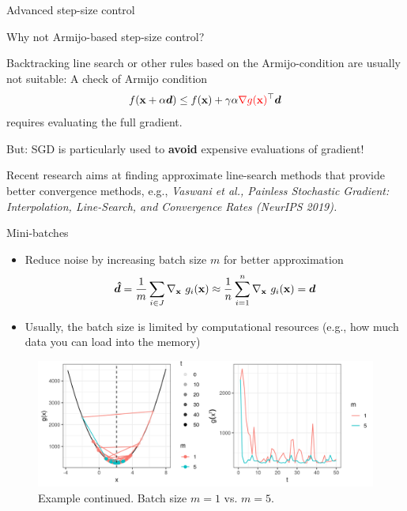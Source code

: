 \documentclass[11pt,compress,t,notes=noshow, xcolor=table]{beamer}
\begin{document}
\begin{vbframe}{Advanced step-size control} 

	\begin{blocki}{Why not Armijo-based step-size control? }
		\item Backtracking line search or other rules based on the Armijo-condition are usually not suitable: A check of Armijo condition 
		$$
		f(\mathbf{x} + \alpha \bm{d}) \le f(\mathbf{x}) + \gamma \alpha \textcolor{red}{\nabla g(\mathbf{x})}^\top \bm{d}
		$$
		requires evaluating the full gradient.
		\item But: SGD is particularly used to \textbf{avoid} expensive evaluations of gradient! 
		\item Recent research aims at finding approximate line-search methods that provide better convergence methods, e.g., \emph{Vaswani et al., Painless Stochastic Gradient: Interpolation, Line-Search, and Convergence Rates (NeurIPS 2019).}
	\end{blocki}

\end{vbframe}


\begin{vbframe}{Mini-batches} 

\begin{itemize}
	\item Reduce noise by increasing batch size $m$ for better approximation
	$$
		\bm{\hat d} = \frac{1}{m} \sum_{i \in J} \nabla_{\mathbf{x}}~ g_i(\mathbf{x}) \approx \frac{1}{n} \sum\limits_{i=1}^n \nabla_{\mathbf{x}}~ g_i(\mathbf{x}) = \bm{d} 
	$$
	\item Usually, the batch size is limited by computational resources (e.g., how much data you can load into the memory)
\end{itemize}

 	\begin{figure}
 		\vspace{-0.3cm}
 		\centering
 		\includegraphics[width = 1\textwidth]{figure_man/sgd_example_batch_size.png} \newline
		Example continued. Batch size $m = 1$ vs. $m = 5$. 
 	\end{figure}

\end{vbframe}
\end{document}
